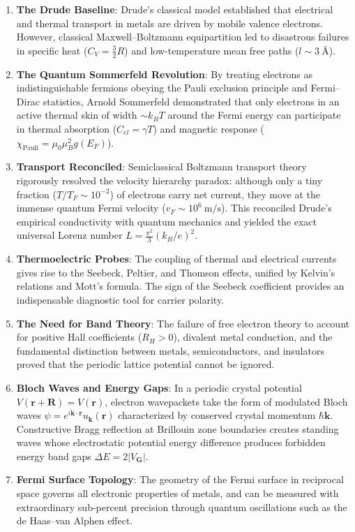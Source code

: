 \documentclass[11pt,a4paper]{article}
\newcommand{\vb}[1]{\mathbf{#1}}
\begin{document}
\begin{enumerate}[leftmargin=*]
    \item \textbf{The Drude Baseline}: Drude's classical model established that electrical and thermal transport in metals are driven by mobile valence electrons. However, classical Maxwell--Boltzmann equipartition led to disastrous failures in specific heat ($C_V = \frac{3}{2}R$) and low-temperature mean free paths ($l \sim 3\ \text{\AA}$).
    \item \textbf{The Quantum Sommerfeld Revolution}: By treating electrons as indistinguishable fermions obeying the Pauli exclusion principle and Fermi--Dirac statistics, Arnold Sommerfeld demonstrated that only electrons in an active thermal skin of width $\sim k_B T$ around the Fermi energy can participate in thermal absorption ($C_{el} = \gamma T$) and magnetic response ($\chi_{\mathrm{Pauli}} = \mu_0 \mu_B^2 g(E_F)$). 
    \item \textbf{Transport Reconciled}: Semiclassical Boltzmann transport theory rigorously resolved the velocity hierarchy paradox: although only a tiny fraction ($T/T_F \sim 10^{-2}$) of electrons carry net current, they move at the immense quantum Fermi velocity ($v_F \sim 10^6\ \mathrm{m/s}$). This reconciled Drude's empirical conductivity with quantum mechanics and yielded the exact universal Lorenz number $L = \frac{\pi^2}{3}(k_B/e)^2$.
    \item \textbf{Thermoelectric Probes}: The coupling of thermal and electrical currents gives rise to the Seebeck, Peltier, and Thomson effects, unified by Kelvin's relations and Mott's formula. The sign of the Seebeck coefficient provides an indispensable diagnostic tool for carrier polarity.
    \item \textbf{The Need for Band Theory}: The failure of free electron theory to account for positive Hall coefficients ($R_H > 0$), divalent metal conduction, and the fundamental distinction between metals, semiconductors, and insulators proved that the periodic lattice potential cannot be ignored.
    \item \textbf{Bloch Waves and Energy Gaps}: In a periodic crystal potential $V(\vb{r}+\vb{R}) = V(\vb{r})$, electron wavepackets take the form of modulated Bloch waves $\psi = e^{i\vb{k}\cdot\vb{r}}u_{\vb{k}}(\vb{r})$ characterized by conserved crystal momentum $\hbar\vb{k}$. Constructive Bragg reflection at Brillouin zone boundaries creates standing waves whose electrostatic potential energy difference produces forbidden energy band gaps $\Delta E = 2|V_{\vb{G}}|$.
    \item \textbf{Fermi Surface Topology}: The geometry of the Fermi surface in reciprocal space governs all electronic properties of metals, and can be measured with extraordinary sub-percent precision through quantum oscillations such as the de Haas--van Alphen effect.
\end{enumerate}
\end{document}
